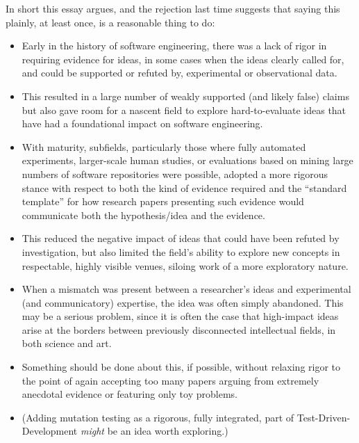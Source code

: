 \documentclass[sigplan,screen]{acmart}
\begin{document}
In short this essay argues, and the rejection last time suggests that
saying this plainly, at least once, is a reasonable thing to do:

\begin{itemize}
  \item Early in the history of software engineering, there was a lack
    of rigor in requiring evidence for ideas, in some cases when the
    ideas clearly called for, and could be supported or refuted by,
    experimental or observational data.
    \item This resulted in a large number of weakly supported (and
      likely false) claims but also gave room for a nascent field to
      explore hard-to-evaluate ideas that have had a foundational
      impact on software engineering.
      \item With maturity, subfields, particularly those where fully
        automated experiments, larger-scale human studies, or
        evaluations based on mining large numbers of software
        repositories were possible, adopted a more rigorous stance
        with respect to both the kind of evidence required and the
        ``standard template'' for how research papers presenting such
        evidence would communicate both the hypothesis/idea and the
        evidence.
        \item This reduced the negative impact of ideas that could
          have been refuted by investigation, but also limited the
          field's ability to explore new concepts in respectable,
          highly visible venues, siloing work of a more exploratory
          nature.
          \item When a mismatch was present between a researcher's
            ideas and experimental (and communicatory) expertise, the
            idea was often simply abandoned.  This may be a serious
            problem, since it is often the case that high-impact ideas
            arise at the borders between previously disconnected
            intellectual fields, in both science and art.
            \item Something should be done about this, if possible,
              without relaxing rigor to the point of again accepting
              too many papers arguing from extremely anecdotal
              evidence or featuring only toy problems.
              \item (Adding mutation testing as a rigorous, fully
                integrated, part of Test-Driven-Development
                \emph{might} be an idea worth exploring.)
              \end{itemize}
\end{document}
